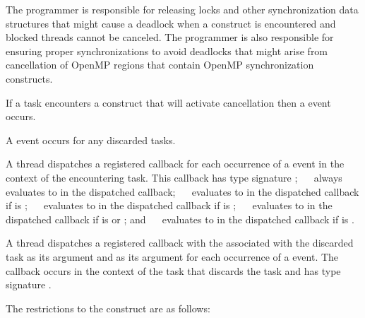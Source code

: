 \begin{note}
The programmer is responsible for releasing locks and
other synchronization data structures that might cause a deadlock when
a  construct is encountered and blocked threads cannot be
canceled. The programmer is also responsible for ensuring proper
synchronizations to avoid deadlocks that might arise from cancellation
of OpenMP regions that contain OpenMP synchronization constructs.
\end{note}

\events

If a task encounters a  construct that will
  activate cancellation then a  event occurs.

A  event occurs for any discarded tasks.

\tools

A thread dispatches a registered  callback 
for each occurrence of a  event in the context of the encountering 
task. This callback has type signature ; 
\code{(}~\code{&}~ always evaluates 
to  in the dispatched callback; 
\code{(}~\code{&}~ evaluates to 
 in the dispatched callback if  is
; 
\code{(}~\code{&}~ evaluates to 
 in the dispatched callback if  is
; 
\code{(}~\code{&}~ evaluates to 
 in the dispatched callback if  is
 or ; and 
\code{(}~\code{&}~ evaluates to 
 in the dispatched callback if  is
. 

A thread dispatches a registered  callback with
the  associated with the discarded task as its  
argument and  as its  argument
for each occurrence of a  event. The callback occurs in 
the context of the task that discards the task and has type signature 
.

\restrictions
The restrictions to the  construct are as follows:

